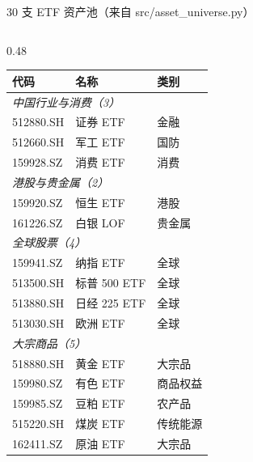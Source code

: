 \documentclass[aspectratio=169,11pt]{beamer}
\newcommand{\etfCount}{30}
\begin{document}
\begin{frame}{\etfCount{} 支 ETF 资产池（来自 src/asset\_universe.py）}
\begin{columns}[T]
    \begin{column}{0.48\textwidth}
      \begin{tabular}{@{}lll@{}}
        \toprule
        代码 & 名称 & 类别 \\
        \midrule
        \multicolumn{3}{l}{\textit{中国行业与消费（3）}} \\
        512880.SH & 证券 ETF & 金融 \\
        512660.SH & 军工 ETF & 国防 \\
        159928.SZ & 消费 ETF & 消费 \\
        \midrule
        \multicolumn{3}{l}{\textit{港股与贵金属（2）}} \\
        159920.SZ & 恒生 ETF & 港股 \\
        161226.SZ & 白银 LOF & 贵金属 \\
        \midrule
        \multicolumn{3}{l}{\textit{全球股票（4）}} \\
        159941.SZ & 纳指 ETF & 全球 \\
        513500.SH & 标普 500 ETF & 全球 \\
        513880.SH & 日经 225 ETF & 全球 \\
        513030.SH & 欧洲 ETF & 全球 \\
        \midrule
        \multicolumn{3}{l}{\textit{大宗商品（5）}} \\
        518880.SH & 黄金 ETF & 大宗品 \\
        159980.SZ & 有色 ETF & 商品权益 \\
        159985.SZ & 豆粕 ETF & 农产品 \\
        515220.SH & 煤炭 ETF & 传统能源 \\
        162411.SZ & 原油 ETF & 大宗品 \\
        \bottomrule
      \end{tabular}
    \end{column}
  \end{columns}
\end{frame}
\end{document}
